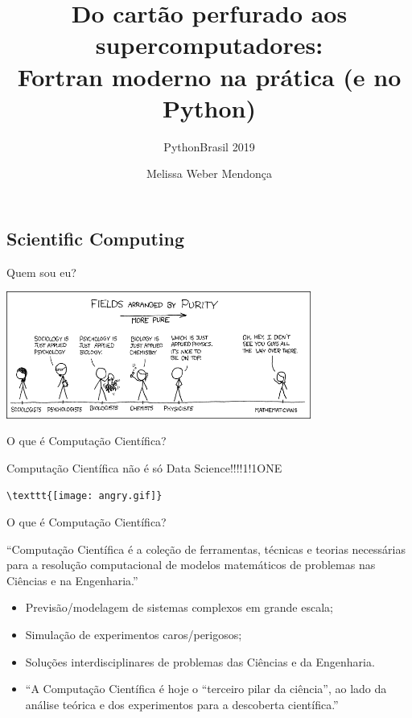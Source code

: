 \documentclass{beamer}
\title{\Large{Do cartão perfurado aos supercomputadores:\\
Fortran moderno na prática (e no Python)}}
\subtitle{PythonBrasil 2019}
\author{Melissa Weber Mendonça}
\begin{document}

\frame{\maketitle}

\begin{darkframes}
  \section{Scientific Computing}
  
  \begin{frame}{Quem sou eu?}
    \begin{center}
      \includegraphics[width=10cm]{figures/purity.png}
    \end{center}
  \end{frame}
  
  \begin{frame}[fragile]{O que é Computação Científica?}
    \begin{center}
      \alert{Computação Científica não é só Data Science!!!!1!1ONE}
    \end{center}
    \vfill
    \begin{center}
      \verb+\texttt{[image: angry.gif]}+
    \end{center}
  \end{frame}
  
  \begin{frame}{O que é Computação Científica?}
    \begin{block}{}
      ``Computação Científica é a coleção de ferramentas, técnicas e teorias necessárias para a resolução computacional de modelos matemáticos de problemas nas Ciências e na Engenharia.'' \cite{GolubOrtega}
    \end{block}
    \begin{itemize}
    \item<2-> Previsão/modelagem de sistemas complexos em grande escala;
    \item<3-> Simulação de experimentos caros/perigosos;
    \item<4-> Soluções interdisciplinares de problemas das Ciências e da Engenharia.
    \item<5> ``A Computação Científica é hoje o “terceiro pilar da ciência”, ao lado da análise teórica e dos experimentos para a descoberta científica.'' \cite{TUKweb}
    \end{itemize}
  \end{frame}


\end{darkframes}
\end{document}

